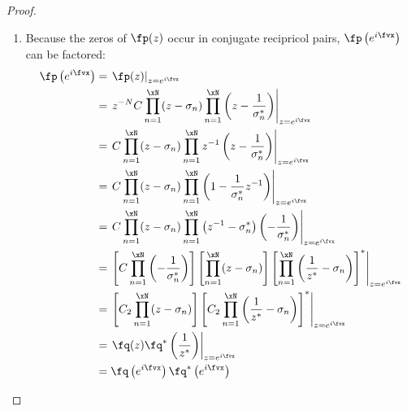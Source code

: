 \begin{proof}
\begin{enumerate}
\item Because the zeros of $\fp(z)$ occur in conjugate recipricol pairs,
$\fp\left(e^{i\fvx}\right)$ can be factored:
\begin{align*}
  \fp\left(e^{i\fvx}\right)
    &= \left. \fp(z) \right|_{z=e^{i\fvx}}
  \\&= \left. z^{-N} C
         \prod_{n=1}^{\xN} (z-\sigma_n) 
         \prod_{n=1}^{\xN} \left( z - \frac{1}{\sigma_n^\ast} \right)
       \right|_{z=e^{i\fvx}}
  \\&= \left. C
         \prod_{n=1}^{\xN} (z-\sigma_n) 
         \prod_{n=1}^{\xN} z^{-1}\left( z - \frac{1}{\sigma_n^\ast} \right)
       \right|_{z=e^{i\fvx}}
  \\&= \left. C
         \prod_{n=1}^{\xN} (z-\sigma_n) 
         \prod_{n=1}^{\xN} \left( 1 - \frac{1}{\sigma_n^\ast} z^{-1}\right)
       \right|_{z=e^{i\fvx}}
  \\&= \left. C
         \prod_{n=1}^{\xN} (z-\sigma_n) 
         \prod_{n=1}^{\xN} \left( z^{-1}-\sigma_n^\ast \right)
                       \left(-\frac{1}{\sigma_n^\ast}\right)
       \right|_{z=e^{i\fvx}}
  \\&= \left. 
         \left[ C \prod_{n=1}^{\xN} \left(-\frac{1}{\sigma_n^\ast}\right)   \right]
         \left[ \prod_{n=1}^{\xN} (z-\sigma_n)                              \right]
         \left[ \prod_{n=1}^{\xN} \left( \frac{1}{z^\ast}-\sigma_n \right)       \right]^\ast
       \right|_{z=e^{i\fvx}}
  \\&= \left. 
         \left[ C_2 \prod_{n=1}^{\xN} (z-\sigma_n)                              \right]
         \left[ C_2 \prod_{n=1}^{\xN} \left( \frac{1}{z^\ast}-\sigma_n \right)       \right]^\ast
       \right|_{z=e^{i\fvx}}
  \\&= \left. \fq(z) \fq^\ast\left(\frac{1}{z^\ast}\right)
       \right|_{z=e^{i\fvx}}
  \\&= \fq\left(e^{i\fvx}\right)\fq^\ast\left(e^{i\fvx}\right)
\end{align*}

\end{enumerate}
\end{proof}





